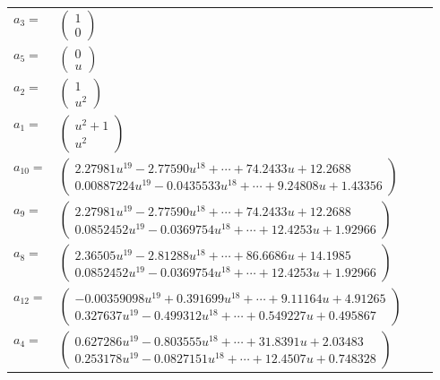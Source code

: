 \documentclass[1p]{elsarticle_modified}
\theoremstyle{definition}
\begin{document}
\begin{tabular}{m{7pt} m{180pt} m{7pt} m{180pt} }
\flushright $a_{3}=$&$\begin{pmatrix}1\\0\end{pmatrix}$ \\
\flushright $a_{5}=$&$\begin{pmatrix}0\\u\end{pmatrix}$ \\
\flushright $a_{2}=$&$\begin{pmatrix}1\\u^2\end{pmatrix}$ \\
\flushright $a_{1}=$&$\begin{pmatrix}u^2+1\\u^2\end{pmatrix}$ \\
\flushright $a_{10}=$&$\begin{pmatrix}2.27981 u^{19}-2.77590 u^{18}+\cdots+74.2433 u+12.2688\\0.00887224 u^{19}-0.0435533 u^{18}+\cdots+9.24808 u+1.43356\end{pmatrix}$ \\
\flushright $a_{9}=$&$\begin{pmatrix}2.27981 u^{19}-2.77590 u^{18}+\cdots+74.2433 u+12.2688\\0.0852452 u^{19}-0.0369754 u^{18}+\cdots+12.4253 u+1.92966\end{pmatrix}$ \\
\flushright $a_{8}=$&$\begin{pmatrix}2.36505 u^{19}-2.81288 u^{18}+\cdots+86.6686 u+14.1985\\0.0852452 u^{19}-0.0369754 u^{18}+\cdots+12.4253 u+1.92966\end{pmatrix}$ \\
\flushright $a_{12}=$&$\begin{pmatrix}-0.00359098 u^{19}+0.391699 u^{18}+\cdots+9.11164 u+4.91265\\0.327637 u^{19}-0.499312 u^{18}+\cdots+0.549227 u+0.495867\end{pmatrix}$ \\
\flushright $a_{4}=$&$\begin{pmatrix}0.627286 u^{19}-0.803555 u^{18}+\cdots+31.8391 u+2.03483\\0.253178 u^{19}-0.0827151 u^{18}+\cdots+12.4507 u+0.748328\end{pmatrix}$ \\

\end{tabular}
\end{document}
